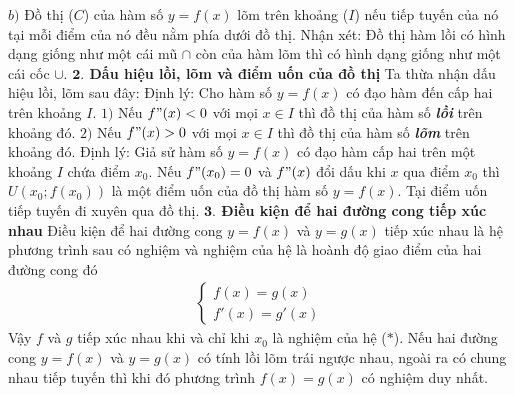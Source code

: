 \begin{multicols}{2}
	\vskip 0.1cm
	$b)$ Đồ thị ($C$) của hàm số $ y = f(x)$ lõm trên khoảng ($I$) nếu tiếp tuyến của nó tại mỗi điểm của nó đều nằm phía dưới đồ thị.
	\vskip 0.1cm
	Nhận xét: Đồ thị hàm lồi có hình dạng giống như một cái mũ $\cap $ còn của hàm lõm thì có hình dạng giống như một cái cốc  $\cup $.
	\vskip 0.1cm
	\textbf{\color{diendantoanhoc}$\pmb{2.}$ Dấu hiệu lồi, lõm và điểm uốn của đồ thị}
	\vskip 0.1cm
	Ta thừa nhận dấu hiệu lồi, lõm sau đây:
	\vskip 0.1cm
	Định lý: Cho hàm số $y = f(x)$ có đạo hàm đến cấp hai trên khoảng $I$.
	\vskip 0.1cm
	$1)$ Nếu $f "(x)< 0$ với mọi $x\in I$ thì đồ thị của hàm số \textbf{\color{diendantoanhoc}\itshape lồi} trên khoảng đó. 
	\vskip 0.1cm
	$2)$ Nếu $f "(x)> 0$ với mọi $x\in I$ thì đồ thị của hàm số  \textbf{\color{diendantoanhoc}\itshape lõm} trên khoảng đó.
	\vskip 0.1cm
	Định lý: Giả sử hàm số $y = f(x)$ có đạo hàm cấp hai trên một khoảng $I$ chứa điểm $ x _0$. Nếu $f"(x_0) = 0$ và $f"(x) $ đổi dấu khi $x$ qua điểm $x_0$ thì $U(x_0;f(x_0))$ là một điểm uốn của đồ thị hàm số $y = f(x)$.
	\vskip 0.1cm
	Tại điểm uốn tiếp tuyến đi xuyên qua đồ thị.
	\vskip 0.1cm
	\textbf{\color{diendantoanhoc}$\pmb{3.}$ Điều kiện để hai đường cong tiếp xúc nhau}
	\vskip 0.1cm
	Điều kiện để hai đường cong $y= f(x)$ và $y=g(x) $ tiếp xúc nhau là hệ phương trình sau có nghiệm và nghiệm của hệ là hoành độ giao điểm của hai đường cong đó \begin{align*}
		\begin{cases}f(x)=g(x)\\ f'(x)=g'(x)\end{cases}\tag{$*$}
	\end{align*}
	Vậy $f$ và $g$ tiếp xúc nhau khi và chỉ khi $x_0$ là nghiệm của hệ ($*$).
	\vskip 0.1cm
	Nếu hai đường cong $y=f(x)$ và $y=g(x)$ có tính lồi lõm trái ngược nhau, ngoài ra có chung nhau tiếp tuyến thì khi đó phương trình $f(x)=g(x)$ có nghiệm duy nhất.
	\begin{center}
\end{center}
\end{multicols}
